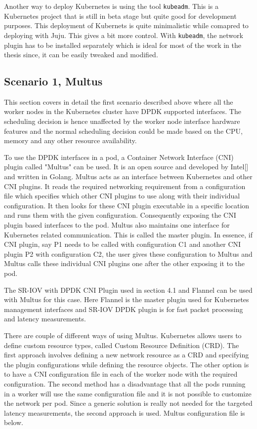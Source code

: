 \documentclass[english, 12pt, a4paper, elec, utf8, a-1b, online]{aaltothesis}
\begin{document}
Another way to deploy Kubernetes is using the tool \lstinline{kubeadm}. This is a Kubernetes project that is still in beta stage but quite good for development purposes. This deployment of Kubernets is quite minimalistic while comapred to deploying with Juju. This gives a bit more control. With \lstinline{kubeadm}, the network plugin has to be installed separately which is ideal for most of the work in the thesis since, it can be easily tweaked and modified.

\subsection{Scenario 1, Multus}
This section covers in detail the first scenario described above where all the worker nodes in the Kubernetes cluster have DPDK supported interfaces. The scheduling decision is hence unaffected by the worker node interface hardware features and the normal scheduling decision could be made based on the CPU, memory  and any other resource availability.

To use the DPDK interfaces in a pod, a Container Network Interface (CNI) plugin called "Multus" can be used. It is an open source and developed by Intel[] and written in Golang. Multus acts as an interface between Kubernetes and other CNI plugins. It reads the required networking requirement from a configuration file which specifies which other CNI plugins to use along with their individual configuration. It then looks for these CNI plugin executable in a specific location and runs them with the given configuration. Consequently exposing the CNI plugin based interfaces to the pod. Multus also maintains one interface for Kubernetes related communication. This is called the master plugin. In essence, if CNI plugin, say P1 needs to be called with configuration C1 and another CNI plugin P2 with configuration C2, the user gives these configuration to Multus and Multus calls these individual CNI plugins one after the other exposing it to the pod.

The SR-IOV with DPDK CNI Plugin used in section 4.1 and Flannel can be used with Multus for this case. Here Flannel is the master plugin used for Kubernetes management interfaces and SR-IOV DPDK plugin is for fast packet processing and latency measurements.

There are couple of different ways of using Multus. Kubernetes allows users to define custom resource types, called Custom Resource Definition (CRD). The first approach involves defining a new network resource as a CRD and specifying the plugin configurations while defining the resource objects. The other option is to have a CNI configuration file in each of the worker node with the required configuration. The second method has a disadvantage that all the pods running in a worker will use the same configuration file and it is not possible to customize the network per pod. Since a generic solution is really not needed for the targeted latency measurements, the second approach is used. Multus configuration file is below.
\end{document}
